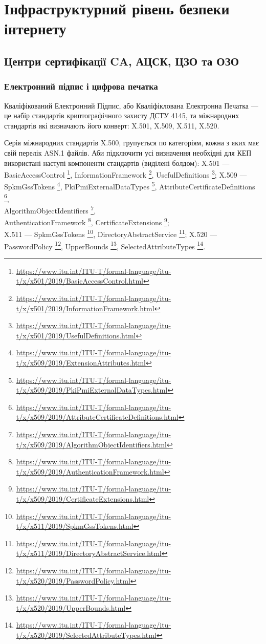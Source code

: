 \chapter{Інфраструктурний рівень безпеки інтернету}

\section{Центри сертифікації CA, АЦСК, ЦЗО та ОЗО}

\subsection{Електронний підпис і цифрова печатка}

Кваліфікований Електронний Підпис, або Кваліфіклована Електронна Печатка ---
це набір стандартів криптографічного захисту ДСТУ 4145,
та міжнародних стандартів які визначають його конверт: X.501, X.509, X.511, X.520.

\renewcommand{\footnotesize}{\tiny}

Серія міжнародних стандартів X.500, групується по категоріям, кожна
з яких має свій перелік ASN.1 файлів. Аби підключити усі визначення необхідні
для КЕП використані наступі компоненти стандартів (виділені болдом):
X.501 --- BasicAccessControl \footnote{\url{https://www.itu.int/ITU-T/formal-language/itu-t/x/x501/2019/BasicAccessControl.html}},
InformationFramework \footnote{\url{https://www.itu.int/ITU-T/formal-language/itu-t/x/x501/2019/InformationFramework.html}},
UsefulDefinitions \footnote{\url{https://www.itu.int/ITU-T/formal-language/itu-t/x/x501/2019/UsefulDefinitions.html}};
X.509 --- SpkmGssTokens \footnote{\url{https://www.itu.int/ITU-T/formal-language/itu-t/x/x509/2019/ExtensionAttributes.html}},
PkiPmiExternalDataTypes \footnote{\url{https://www.itu.int/ITU-T/formal-language/itu-t/x/x509/2019/PkiPmiExternalDataTypes.html}},
AttributeCertificateDefinitions \footnote{\url{https://www.itu.int/ITU-T/formal-language/itu-t/x/x509/2019/AttributeCertificateDefinitions.html}}, \\
AlgorithmObjectIdentifiers \footnote{\url{https://www.itu.int/ITU-T/formal-language/itu-t/x/x509/2019/AlgorithmObjectIdentifiers.html}}, \\
AuthenticationFramework \footnote{\url{https://www.itu.int/ITU-T/formal-language/itu-t/x/x509/2019/AuthenticationFramework.html}},
CertificateExtensions \footnote{\url{https://www.itu.int/ITU-T/formal-language/itu-t/x/x509/2019/CertificateExtensions.html}}; \\
X.511 --- SpkmGssTokens \footnote{\url{https://www.itu.int/ITU-T/formal-language/itu-t/x/x511/2019/SpkmGssTokens.html}},
DirectoryAbstractService \footnote{\url{https://www.itu.int/ITU-T/formal-language/itu-t/x/x511/2019/DirectoryAbstractService.html}};
X.520 --- PasswordPolicy \footnote{\url{https://www.itu.int/ITU-T/formal-language/itu-t/x/x520/2019/PasswordPolicy.html}},
UpperBounds \footnote{\url{https://www.itu.int/ITU-T/formal-language/itu-t/x/x520/2019/UpperBounds.html}},
SelectedAttributeTypes \footnote{\url{https://www.itu.int/ITU-T/formal-language/itu-t/x/x520/2019/SelectedAttributeTypes.html}}.

